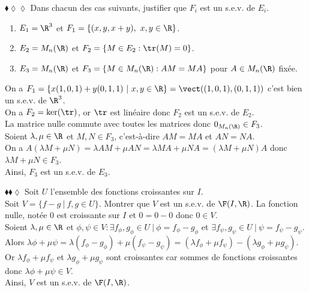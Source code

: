 \documentclass[11pt]{article}
\begin{document}
\begin{exercice}{$\blacklozenge\lozenge\lozenge$}{}
    Dans chacun des cas suivants, justifier que $F_i$ est un s.e.v. de $E_i$.
    \begin{enumerate}
        \item $E_1 = \R^3$ et $F_1 = \{(x, y, x + y), ~ x,y \in \R\}$. 
        \item $E_2 = M_n(\R)$ et $F_2 = \{M \in E_2 : \tr(M) = 0\}$.
        \item $E_3 = M_n(\R)$ et $F_3 = \{M \in M_n(\R) : AM = MA\}$ pour $A \in M_n(\R)$ fixée.
    \end{enumerate}
    \tcblower
     On a $F_1 = \{x(1, 0, 1) + y(0, 1, 1) ~ | ~ x,y \in \R\} = \vect((1, 0, 1), (0, 1, 1))$ c'est bien un s.e.v. de $\R^3$.\\[0.2cm]
     On a $F_2 = \ker(\tr)$, or $\tr$ est linéaire donc $F_2$ est un s.e.v. de $E_2$.\\[0.2cm]
     La matrice nulle commute avec toutes les matrices donc $0_{M_n(\R)} \in F_3$.\\
    Soient $\lambda, \mu \in \R$ et $M, N \in F_3$, c'est-à-dire $AM = MA$ et $AN = NA$.\\
    On a $A(\lambda M + \mu N) = \lambda AM + \mu AN = \lambda MA + \mu NA = (\lambda M + \mu N)A$ donc $\lambda M + \mu N \in F_3$.\\
    Ainsi, $F_3$ est un s.e.v. de $E_3$.
\end{exercice}

\begin{exercice}{$\blacklozenge\blacklozenge\lozenge$}{}
    Soit $U$ l'ensemble des fonctions croissantes sur $I$.\\
    Soit $V = \{f - g ~ | ~ f,g \in U\}$. Montrer que $V$ est un s.e.v. de $\F(I, \R)$.
    \tcblower
    La fonction nulle, notée $0$ est croissante sur $I$ et $0 = 0 - 0$ donc $0 \in V$.\\ 
    Soient $\lambda,\mu\in\R$ et $\phi, \psi \in V : \exists f_\phi,g_\phi \in U ~ | ~ \phi = f_\phi - g_\phi$ et $\exists f_\psi,g_\psi \in U ~ | ~ \psi = f_\psi - g_\psi$.\\
    Alors $\lambda\phi + \mu\psi = \lambda(f_\phi - g_\phi) + \mu(f_\psi - g_\psi) = (\lambda f_\phi + \mu f_\psi) - (\lambda g_\phi + \mu g_\psi)$.\\
    Or $\lambda f_\phi + \mu f_\psi$ et $\lambda g_\phi + \mu g_\psi$ sont croissantes car sommes de fonctions croissantes donc $\lambda\phi + \mu\psi \in V$.\\
    Ainsi, $V$ est un s.e.v. de $\F(I, \R)$.
\end{exercice}
\end{document}
